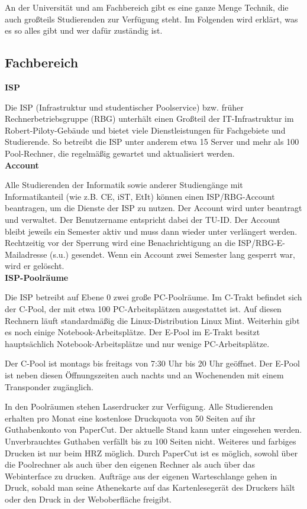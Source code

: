 {An der Universität und am Fachbereich gibt es eine ganze Menge Technik, die auch großteils Studierenden zur Verfügung steht. Im Folgenden wird erklärt, was es so alles gibt und wer dafür zuständig ist.
}{
    \subsection*{Fachbereich}

    \noindent\textbf{ISP}

    Die ISP (Infrastruktur und studentischer Poolservice) \footnotemark[1] bzw. früher Rechnerbetriebsgruppe (RBG) unterhält einen Großteil der IT-Infrastruktur im Robert-Piloty-Gebäude und bietet viele Dienstleistungen für Fachgebiete und Studierende. So betreibt die ISP unter anderem etwa 15 Server und mehr als 100 Pool-Rechner, die regelmäßig gewartet und aktualisiert werden.\\

    \noindent\textbf{Account}

    Alle Studierenden der Informatik sowie anderer Studiengänge mit Informatikanteil (wie z.B. CE, iST, EtIt) können einen ISP/RBG-Account beantragen, um die Dienste der ISP zu nutzen. Der Account wird unter \footnotemark[2] beantragt und verwaltet. Der Benutzername entspricht dabei der TU-ID. Der Account bleibt jeweils ein Semester aktiv und muss dann wieder unter \footnotemark[2] verlängert werden. Rechtzeitig vor der Sperrung wird eine Benachrichtigung an die ISP/RBG-E-Mailadresse (s.u.) gesendet. Wenn ein Account zwei Semester lang gesperrt war, wird er gelöscht.\\

    \noindent\textbf{ISP-Poolräume}

    Die ISP betreibt auf Ebene 0 zwei große PC-Poolräume. Im C-Trakt befindet sich der C-Pool, der mit etwa 100 PC-Arbeitsplätzen ausgestattet ist. Auf diesen Rechnern läuft standardmäßig die Linux-Distribution Linux Mint. Weiterhin gibt es noch einige Notebook-Arbeitsplätze. Der E-Pool im E-Trakt besitzt hauptsächlich Notebook-Arbeitsplätze und nur wenige PC-Arbeitsplätze.

    Der C-Pool ist montags bis freitags von 7:30 Uhr bis 20 Uhr geöffnet. Der E-Pool ist neben diesen Öffnungszeiten auch nachts und an Wochenenden mit einem Transponder zugänglich.

    In den Poolräumen stehen Laserdrucker zur Verfügung. Alle Studierenden erhalten pro Monat eine kostenlose Druckquota von 50 Seiten auf ihr Guthabenkonto von PaperCut. Der aktuelle Stand kann unter \footnotemark[3] eingesehen werden. Unverbrauchtes Guthaben verfällt bis zu 100 Seiten nicht. Weiteres und farbiges Drucken ist nur beim HRZ möglich.
    Durch PaperCut ist es möglich, sowohl über die Poolrechner als auch über den eigenen Rechner als auch über das Webinterface \footnotemark[3] zu drucken.
    Aufträge aus der eigenen Warteschlange gehen in Druck, sobald man seine Athenekarte auf das Kartenlesegerät des Druckers hält oder den Druck in der Weboberfläche freigibt.

}
